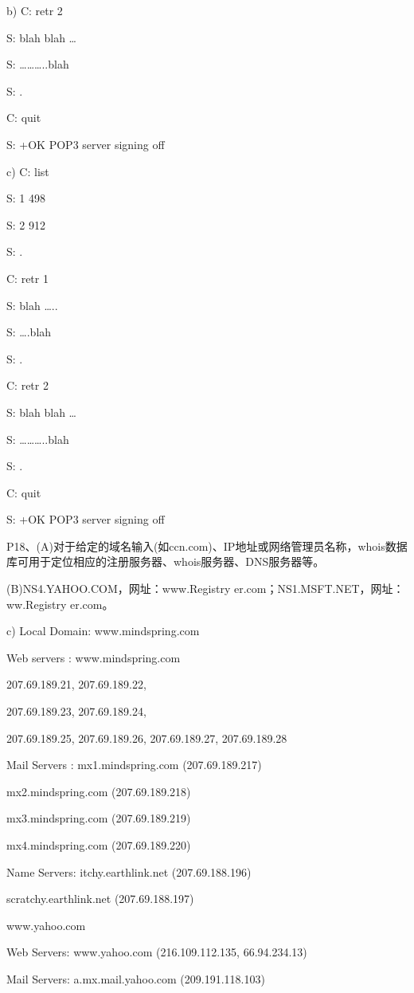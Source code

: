 \documentclass[11pt,UTF8,twoside]{article}
\begin{document}
	b) C: retr 2 
	
	S: blah blah … 
	
	S: ………..blah 
	
	S: . 
	
	C: quit 
	
	S: +OK POP3 server signing off 
	
	c) C: list 
	
	S: 1 498 
	
	S: 2 912 
	
	S: . 
	
	C: retr 1 
	
	S: blah ….. 
	
	S: ….blah 
	
	S: . 
	
	C: retr 2 
	
	S: blah blah … 
	
	S: ………..blah 
	
	S: . 
	
	C: quit 
	
	S: +OK POP3 server signing off 
	
	P18、(A)对于给定的域名输入(如ccn.com)、IP地址或网络管理员名称，whois数据库可用于定位相应的注册服务器、whois服务器、DNS服务器等。
	
	(B)NS4.YAHOO.COM，网址：www.Registry er.com；NS1.MSFT.NET，网址：ww.Registry er.com。
	
	c) Local Domain: www.mindspring.com 
	
	Web servers : www.mindspring.com 
	
	207.69.189.21, 207.69.189.22, 
	
	207.69.189.23, 207.69.189.24, 
	
	207.69.189.25, 207.69.189.26, 207.69.189.27, 
	207.69.189.28 
	
	Mail Servers : mx1.mindspring.com (207.69.189.217) 
	
	mx2.mindspring.com (207.69.189.218) 
	
	mx3.mindspring.com (207.69.189.219) 
	
	mx4.mindspring.com (207.69.189.220) 
	
	Name Servers: itchy.earthlink.net (207.69.188.196) 
	
	scratchy.earthlink.net (207.69.188.197) 
	
	www.yahoo.com 
	
	Web Servers: www.yahoo.com (216.109.112.135, 66.94.234.13) 
	
	Mail Servers: a.mx.mail.yahoo.com (209.191.118.103) 
	
\end{document}
